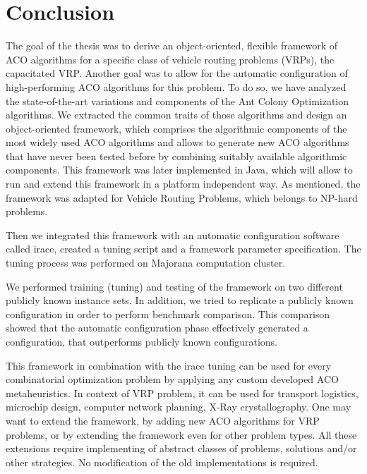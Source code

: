 \documentclass[12pt,a4paper,oneside]{book}
\begin{document}
\chapter{Conclusion}

The goal of the thesis was to derive an object-oriented, flexible framework of ACO algorithms for a specific class of vehicle routing problems (VRPs), the capacitated VRP. Another goal was to allow for the automatic configuration of high-performing ACO algorithms for this problem. To do so, we have analyzed the state-of-the-art variations and components of the Ant Colony Optimization algorithms. We extracted the common traits of those algorithms and design an object-oriented framework, which comprises the algorithmic components of the most widely used ACO algorithms and allows to generate new ACO algorithms that have never been tested before by combining suitably available algorithmic components. This framework was later implemented in Java, which will allow to run and extend this framework in a platform independent way. As mentioned, the framework was adapted for Vehicle Routing Problems, which belongs to NP-hard problems.

Then we integrated this framework with an automatic configuration  software called irace, created a tuning script and a framework parameter specification. The tuning process was performed on Majorana computation cluster.

We performed training (tuning) and testing of the framework on two different publicly known instance sets. In addition, we tried to replicate a publicly known configuration in order to perform benchmark comparison. This comparison showed that the automatic configuration phase effectively generated a configuration, that outperforms publicly known configurations.

This framework in combination with the irace tuning can be used for every combinatorial optimization problem by applying any custom developed ACO metaheuristics. In context of VRP problem, it can be used for transport logistics, microchip design, computer network planning, X-Ray crystallography. One may want to extend the framework, by adding new ACO algorithms for VRP problems, or by extending the framework even for other problem types. All these extensions require implementing of abstract classes of problems, solutions and/or other strategies. No modification of the old implementations is required.


\appendix

\backmatter
\end{document}
